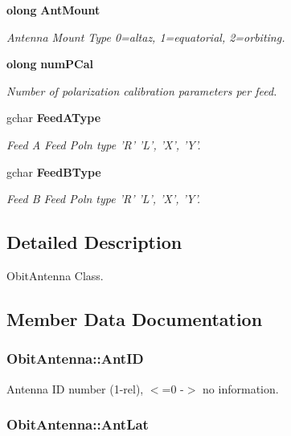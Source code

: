 \begin{CompactItemize}
{\bf olong} {\bf Ant\-Mount}
\begin{CompactList}\small\item\em Antenna Mount Type 0=altaz, 1=equatorial, 2=orbiting. \item\end{CompactList}\item 
{\bf olong} {\bf num\-PCal}
\begin{CompactList}\small\item\em Number of polarization calibration parameters per feed. \item\end{CompactList}\item 
gchar {\bf Feed\-AType}
\begin{CompactList}\small\item\em Feed A Feed Poln type 'R' 'L', 'X', 'Y'. \item\end{CompactList}\item 
gchar {\bf Feed\-BType}
\begin{CompactList}\small\item\em Feed B Feed Poln type 'R' 'L', 'X', 'Y'. \item\end{CompactList}\end{CompactItemize}


\subsection{Detailed Description}
Obit\-Antenna Class. 



\subsection{Member Data Documentation}
\subsubsection{ {\bf Obit\-Antenna::Ant\-ID}}\label{structObitAntenna_o13}


Antenna ID number (1-rel), $<$=0 -$>$ no information. 

\subsubsection{ {\bf Obit\-Antenna::Ant\-Lat}}\label{structObitAntenna_o7}


